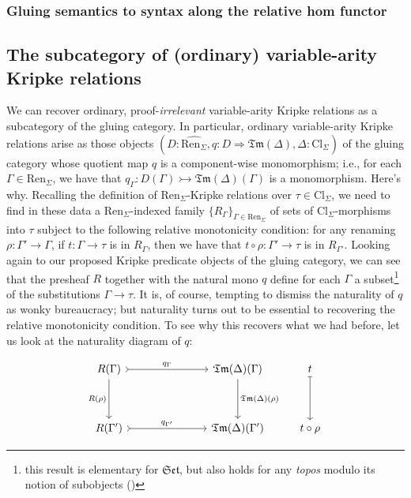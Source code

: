 \documentclass[12pt,twoside]{reedthesis}
\theoremstyle{definition}
\theoremstyle{remark}
\theoremstyle{plain}
\newcommand{\cl}{\text{Cl}_\Sigma}
\newcommand{\ren}{\text{Ren}_\Sigma}
\newcommand{\renhat}{\hat{\ren}}
\newcommand{\tm}{\mathfrak{Tm}}
\newcommand{\catset}{\mathfrak{Set}}
\begin{document}
\subsubsection{Gluing semantics to syntax along the relative hom functor}
\subsection{The subcategory of (ordinary) variable-arity Kripke relations}


We can recover ordinary, proof-\emph{irrelevant} variable-arity Kripke relations
as a subcategory of the gluing category. In particular, ordinary variable-arity
Kripke relations arise as those objects
\( (D : \renhat, q : D \Longrightarrow \tm (\Delta), \Delta : \cl) \) of the gluing category whose
quotient map $q$ is a component-wise monomorphism; i.e., for each
\( \Gamma \in \ren \), we have that \( q_{\Gamma} : D(\Gamma) \rightarrowtail \tm (\Delta)(\Gamma) \) is a monomorphism.
Here's why. Recalling the definition of $\ren$-Kripke relations over $\tau \in \cl$,
we need to find in these data a $\ren$-indexed family \( \{ R_{\Gamma}\}_{\Gamma \in \ren}\)
of sets of $\cl$-morphisms into \( \tau \) subject to the following relative
monotonicity condition: for any renaming \( \rho : \Gamma' \rightarrow \Gamma \), if \( t : \Gamma \rightarrow \tau \) is
in \( R_{\Gamma}\), then we have that \( t \circ \rho : \Gamma' \rightarrow \tau \) is in \( R_{\Gamma'}\). Looking
again to our proposed Kripke predicate objects of the gluing category, we can
see that the presheaf \( R \) together with the natural mono \( q \) define for
each \( \Gamma \) a subset\footnote{this result is elementary for $\catset$, but also
  holds for any \emph{topos} modulo its notion of subobjects
  (\cite{leinster_informal_2011})} of the substitutions \( \Gamma \rightarrow \tau \). It is, of
course, tempting to dismiss the naturality of $q$ as wonky bureaucracy; but
naturality turns out to be essential to recovering the relative monotonicity
condition. To see why this recovers what we had before, let us look at the
naturality diagram of \( q \):

  \[\begin{tikzcd}
      {R (\Gamma)} &&& {\tm(\Delta) (\Gamma)} & t \\
      \\
      {R (\Gamma')} &&& {\tm(\Delta) (\Gamma')} & {t \circ \rho}
      \arrow["{q_{\Gamma}}", from=1-1, to=1-4, rightarrowtail]
      \arrow["{q_{\Gamma'}}", from=3-1, to=3-4, rightarrowtail]
      \arrow["{R (\rho)}"', from=1-1, to=3-1]
      \arrow["{\tm(\Delta) (\rho)}", from=1-4, to=3-4]
      \arrow[from=1-5, to=3-5, mapsto]
    \end{tikzcd}\]
\end{document}
